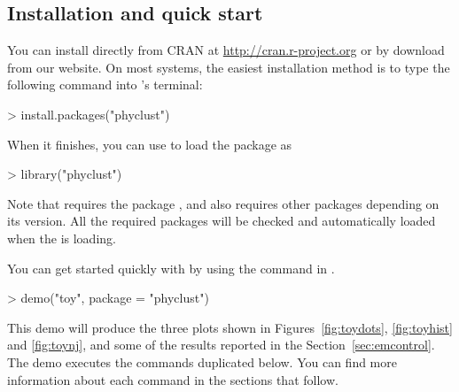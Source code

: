 \subsection[Installation and quick start]{Installation and quick start}
\label{sec:installation}

You can install  directly from CRAN at \url{http://cran.r-project.org} or
by download from our website.
On most systems, the easiest installation method is to type the following command
into 's terminal:
\begin{Code}
> install.packages("phyclust")
\end{Code}
When it finishes, you can use  to load the package as
\begin{Code}
> library("phyclust")
\end{Code}
Note that  requires the  package \citep{Paradis2004}, and
 also requires other packages depending on its version.
All the required packages will be checked and automatically loaded when
the  is loading.

You can get started quickly with  by using the  command
in .
\begin{Code}
> demo("toy", package = "phyclust")
\end{Code}
This demo will produce the three plots shown in Figures~\ref{fig:toydots},
\ref{fig:toyhist} and \ref{fig:toynj}, and some of the results reported in
the Section~\ref{sec:emcontrol}.
The demo executes the commands duplicated below.
You can find more information about each command in the sections that follow.



